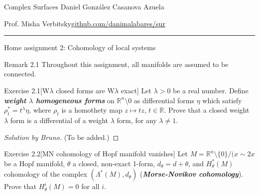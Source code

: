 
\setcounter{secnumdepth}{2}



\begin{minipage}{\textwidth}
	\begin{minipage}{1\textwidth}
		Complex Surfaces \hfill Daniel González Casanova Azuela
		
		{\small Prof. Misha Verbitsky\hfill\href{https://github.com/danimalabares/sur}{github.com/danimalabares/sur}}
	\end{minipage}
\end{minipage}\vspace{.2cm}\hrule

\vspace{10pt}
{\huge Home assignment 2: Cohomology of local systems}

\begin{thing5}{Remark 2.1}\label{rk:2.1}\leavevmode
Throughout this assignment, all manifolds are assumed to be connected.
\end{thing5}

\begin{thing4}{Exercise 2.1}[W\(\lambda\) closed forms are W\(\lambda\) exact]\label{exer:2.1}\leavevmode
Let \(\lambda>0\) be a real number. Define \textit{\textbf{weight \(\lambda\) homogeneous forms}} on \(\mathbb{R}^n\setminus 0\) as differential forms \(\eta\) which satisfy \(\rho_t^*=t^\lambda \eta\), where \(\rho_t\) is a homothety map \(z \mapsto  tz\), \(t \in \mathbb{R}\). Prove that a closed weight \(\lambda\) form is a differential of a weight \(\lambda\) form, for any \(\lambda \neq 1\).
\end{thing4}

\begin{proof}[Solution by Bruno]\leavevmode
	(To be added.)
\end{proof}

\begin{thing4}{Exercise 2.2}[MN cohomology of Hopf manifold vanishes]\label{exer:2.2}\leavevmode
Let \(M=\mathbb{R}^n\setminus\{0\}\Big/(x \sim 2x\) be a Hopf manifold, \(\theta\) a closed, non-exact 1-form, \(d_\theta=d+\theta\), and \(H^*_\theta(M)\) cohomology of the complex \((\Lambda^*(M),d_\theta)\) (\textit{\textbf{Morse-Novikov cohomology}}). Prove that \(H^i_\theta(M)=0\) for all \(i\).
\end{thing4}

